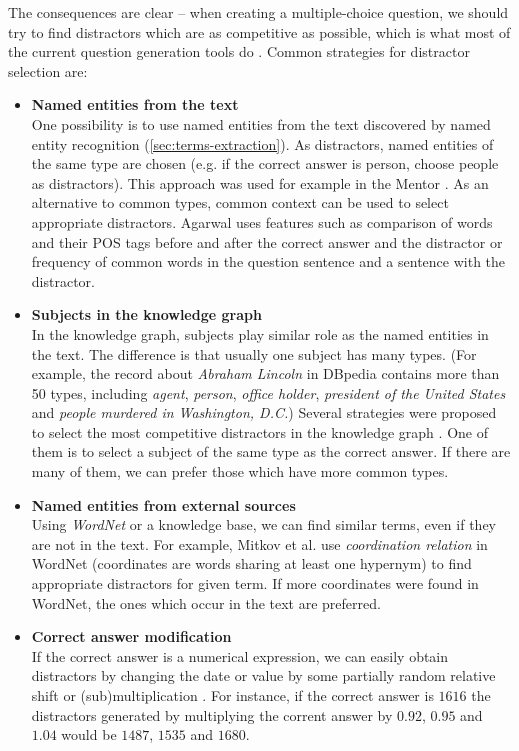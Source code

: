 \documentclass[12pt, twoside]{fithesis2}		%
\renewcommand{\_}{\leavevmode \kern0.07em\vbox{\hrule width0.4em}}
\newcommand{\squarebullet}{\textcolor{black}{\raisebox{0.15em}{\rule{4pt}{4pt}}}}
\newcommand{\emptysquarebullet}{\textcolor{black}{\raisebox{0.10em}{\tiny$\square$}}}
\newenvironment{myItemize}{
  \begin{itemize}[leftmargin=2em,rightmargin=1em,itemsep=\parskip ,parsep=0em,topsep=0em,partopsep=0em]
  \renewcommand{\labelitemi}{\squarebullet}
  \renewcommand{\labelitemii}{\textbullet}
}{
  \end{itemize}
}
\newcounter{choice}
\begin{document}
The consequences are clear -- when creating a multiple-choice question, we should try to find distractors which are as competitive as possible,
which is what most of the current question generation tools do
\cite{question-gen-mitkov, question-gen-textbooks, mentor}.
Common strategies for distractor selection are:
\begin{myItemize}
\item \textbf{Named entities from the text}\\
  One possibility is to use named entities from the text discovered by named entity recognition (\autoref{sec:terms-extraction}). As distractors, named entities of the same type are chosen (e.g. if the correct answer is person, choose people as distractors). This approach was used for example in the Mentor \cite{mentor}.
As an alternative to common types, common context can be used to select appropriate distractors.
Agarwal \cite{question-gen-textbooks} uses features such as comparison of words and their POS tags before and after the correct answer and the distractor or frequency of common words in the question sentence and a sentence with the distractor.

\item \textbf{Subjects in the knowledge graph}\\
In the knowledge graph, subjects play similar role as the named entities in the text.
The difference is that usually one subject has many types.
(For example, the record about \emph{Abraham Lincoln} in DBpedia contains more than 50 types, including
\emph{agent}, \emph{person}, \emph{office holder}, \emph{president of the United States} and \emph{people murdered in Washington, D.C.})
Several strategies were proposed to select the most competitive distractors in the knowledge graph \cite{ontoque, question-gen-domain-ontologies}. One of them is to select a subject of the same type as the correct answer. If there are many of them, we can prefer those which have more common types.

\item \textbf{Named entities from external sources}\\
  Using \textit{WordNet} \cite{wordnet} or a knowledge base, we can find similar terms, even if they are not in the text. For example, Mitkov et al. \cite{question-gen-mitkov} use \textit{coordination relation} in WordNet (coordinates are words sharing at least one hypernym) to find appropriate distractors for given term. If more coordinates were found in WordNet, the ones which occur in the text are preferred.

\item \textbf{Correct answer modification}\\
  If the correct answer is a numerical expression, we can easily obtain distractors by changing the date or value by some partially random relative shift or (sub)multiplication
\cite{question-gen-domain-ontologies}.
For instance, if the correct answer is $1616$ the distractors generated by multiplying the corrent answer by $0.92$, $0.95$ and $1.04$ would be $1487$, $1535$ and $1680$.
\end{myItemize}
\end{document}
